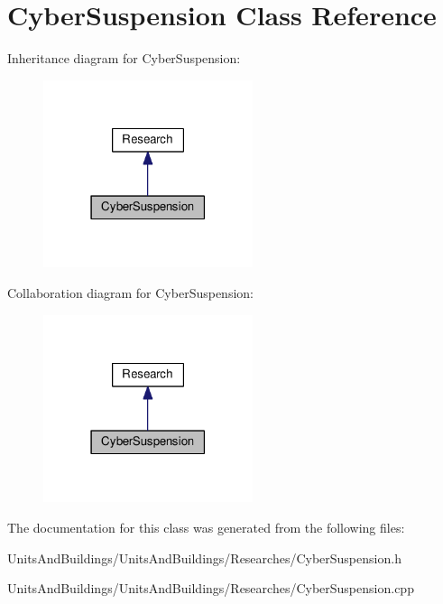 \hypertarget{class_cyber_suspension}{}\section{Cyber\+Suspension Class Reference}
\label{class_cyber_suspension}


Inheritance diagram for Cyber\+Suspension\+:
\nopagebreak
\begin{figure}[H]
\begin{center}
\leavevmode
\includegraphics[width=174pt]{class_cyber_suspension__inherit__graph}
\end{center}
\end{figure}


Collaboration diagram for Cyber\+Suspension\+:
\nopagebreak
\begin{figure}[H]
\begin{center}
\leavevmode
\includegraphics[width=174pt]{class_cyber_suspension__coll__graph}
\end{center}
\end{figure}


The documentation for this class was generated from the following files\+:\begin{DoxyCompactItemize}
\item 
Units\+And\+Buildings/\+Units\+And\+Buildings/\+Researches/Cyber\+Suspension.\+h\item 
Units\+And\+Buildings/\+Units\+And\+Buildings/\+Researches/Cyber\+Suspension.\+cpp\end{DoxyCompactItemize}
